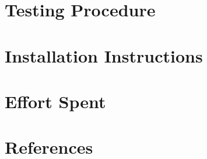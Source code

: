 \documentclass{ConfigurationFiles/Politecnico_Di_Milano}
\begin{document}
    \chapter{Testing Procedure}
    \label{ch:testing_procedure}%
    

    \chapter{Installation Instructions}
    \label{ch:installation_instructions}%
    

    \chapter{Effort Spent}
    \label{ch:effort_spent}%
    

    \chapter{References}
    \label{ch:references}%
    
    \cleardoublepage
\end{document}
